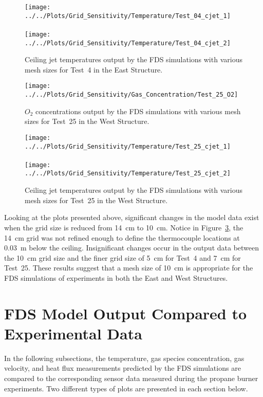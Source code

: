 \begin{figure}[!h]
	\centering
	\texttt{[image: ../../Plots/Grid\_Sensitivity/Temperature/Test\_04\_cjet\_1]}
	\\~\\
	\texttt{[image: ../../Plots/Grid\_Sensitivity/Temperature/Test\_04\_cjet\_2]}
	\caption[Ceiling jet temperatures for East Structure simulations of various mesh sizes.]{Ceiling jet temperatures output by the FDS simulations with various mesh sizes for Test~4 in the East Structure.}
	\label{fig:east_cjet_sensitivity}
\end{figure}

\begin{figure}[!h]
	\centering
	\texttt{[image: ../../Plots/Grid\_Sensitivity/Gas\_Concentration/Test\_25\_O2]}
	\caption[$O_2$ concentrations for West Structure simulations of various mesh sizes.]{$O_2$ concentrations output by the FDS simulations with various mesh sizes for Test~25 in the West Structure.}
	\label{fig:west_O2_sensitivity}
\end{figure}

\begin{figure}[!h]
	\centering
	\texttt{[image: ../../Plots/Grid\_Sensitivity/Temperature/Test\_25\_cjet\_1]}
	\\~\\
	\texttt{[image: ../../Plots/Grid\_Sensitivity/Temperature/Test\_25\_cjet\_2]}
	\caption[Ceiling jet temperatures for West Structure simulations of various mesh sizes.]{Ceiling jet temperatures output by the FDS simulations with various mesh sizes for Test~25 in the West Structure.}
	\label{fig:west_cjet_sensitivity}
\end{figure}

\FloatBarrier

Looking at the plots presented above, significant changes in the model data exist when the grid size is reduced from 14~cm to 10~cm. Notice in Figure~\ref{fig:west_cjet_sensitivity}, the 14~cm grid was not refined enough to define the thermocouple locations at 0.03~m below the ceiling. Insignificant changes occur in the output data between the 10~cm grid size and the finer grid size of 5~cm for Test~4 and 7~cm for Test~25. These results suggest that a mesh size of 10~cm is appropriate for the FDS simulations of experiments in both the East and West Structures.

\section{FDS Model Output Compared to Experimental Data}
In the following subsections, the temperature, gas species concentration, gas velocity, and heat flux measurements predicted by the FDS simulations are compared to the corresponding sensor data measured during the propane burner experiments. Two different types of plots are presented in each section below. 

